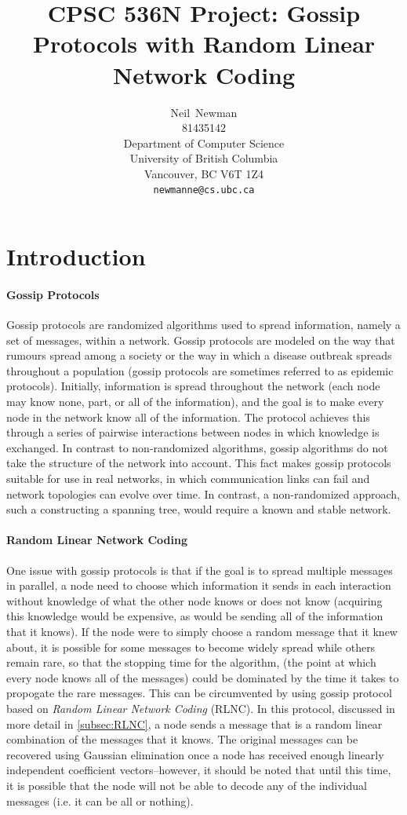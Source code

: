 \documentclass{article} %
\title{CPSC 536N Project: Gossip Protocols with Random Linear Network Coding}
\author{
Neil~Newman\\
81435142\\
Department of Computer Science\\
University of British Columbia\\
Vancouver, BC V6T 1Z4 \\
\texttt{newmanne@cs.ubc.ca}
}
\begin{document}
\maketitle

\section{Introduction}
\paragraph{Gossip Protocols}
Gossip protocols are randomized algorithms used to spread information, namely a set of messages, within a network. Gossip protocols are modeled on the way that rumours spread among a society or the way in which a disease outbreak spreads throughout a population (gossip protocols are sometimes referred to as epidemic protocols). Initially, information is spread throughout the network (each node may know none, part, or all of the information), and the goal is to make every node in the network know all of the information. The protocol achieves this through a series of pairwise interactions between nodes in which knowledge is exchanged. In contrast to non-randomized algorithms, gossip algorithms do not take the structure of the network into account. This fact makes gossip protocols suitable for use in real networks, in which communication links can fail and network topologies can evolve over time. In contrast, a non-randomized approach, such a constructing a spanning tree, would require a known and stable network. 

\paragraph{Random Linear Network Coding}
One issue with gossip protocols is that if the goal is to spread multiple messages in parallel, a node need to choose which information it sends in each interaction without knowledge of what the other node knows or does not know (acquiring this knowledge would be expensive, as would be sending all of the information that it knows). If the node were to simply choose a random message that it knew about, it is possible for some messages to become widely spread while others remain rare, so that the stopping time for the algorithm, (the point at which every node knows all of the messages) could be dominated by the time it takes to propogate the rare messages. This can be circumvented by using gossip protocol based on \emph{Random Linear Network Coding} (RLNC). In this protocol, discussed in more detail in \ref{subsec:RLNC}, a node sends a message that is a random linear combination of the messages that it knows. The original messages can be recovered using Gaussian elimination once a node has received enough linearly independent coefficient vectors--however, it should be noted that until this time, it is possible that the node will not be able to decode any of the individual messages (i.e. it can be all or nothing).
\end{document}
